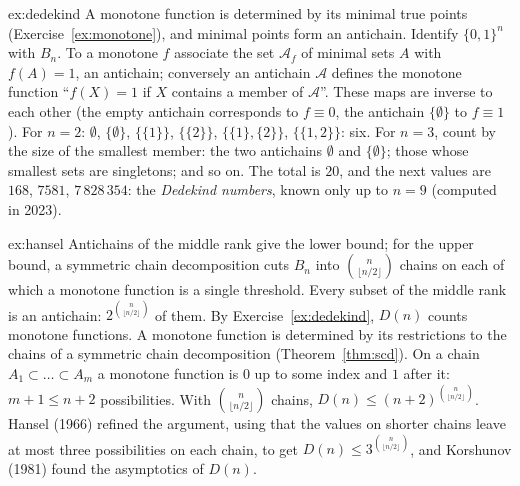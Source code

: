 \begin{solution}{ex:dedekind}
\idea A monotone function is determined by its minimal true points (Exercise~\ref{ex:monotone}), and minimal points form an antichain.
\writeup Identify $\{0,1\}^n$ with $B_n$. To a monotone $f$ associate the set $\mathcal A_f$ of minimal sets $A$ with $f(A)=1$, an antichain; conversely an
antichain $\mathcal A$ defines the monotone function ``$f(X)=1$ if $X$ contains a member of $\mathcal A$''. These maps are inverse to each other (the
empty antichain corresponds to $f\equiv0$, the antichain $\{\emptyset\}$ to $f\equiv1$). For $n=2$: $\emptyset$, $\{\emptyset\}$, $\{\{1\}\}$, $\{\{2\}\}$, $\{\{1\},\{2\}\}$,
$\{\{1,2\}\}$: six. For $n=3$, count by the size of the smallest member: the two antichains $\emptyset$ and $\{\emptyset\}$; those whose smallest
sets are singletons; and so on. The total is $20$, and the next values are $168$, $7581$, $7\,828\,354$: the \emph{Dedekind numbers}, known
only up to $n=9$ (computed in 2023).
\end{solution}

\begin{solution}{ex:hansel}
\idea Antichains of the middle rank give the lower bound; for the upper bound, a symmetric chain decomposition cuts $B_n$ into
$\binom n{\lfloor n/2\rfloor}$ chains on each of which a monotone function is a single threshold.
\writeup Every subset of the middle rank is an antichain: $2^{\binom n{\lfloor n/2\rfloor}}$ of them. By Exercise~\ref{ex:dedekind}, $D(n)$ counts monotone functions. A
monotone function is determined by its restrictions to the chains of a symmetric chain decomposition
(Theorem~\ref{thm:scd}). On a chain $A_1\subset\dots\subset A_m$ a monotone function is $0$ up to some index and $1$ after it: $m+1\le n+2$ possibilities. With
$\binom n{\lfloor n/2\rfloor}$ chains, $D(n)\le(n+2)^{\binom n{\lfloor n/2\rfloor}}$. Hansel (1966) refined the argument, using that the values on shorter chains leave at most
three possibilities on each chain, to get $D(n)\le3^{\binom n{\lfloor n/2\rfloor}}$, and Korshunov (1981) found the asymptotics of $D(n)$.
\end{solution}


